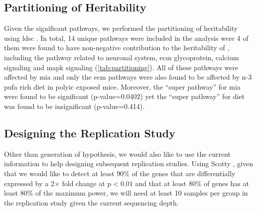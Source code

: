\documentclass[12pt]{scrbook}
\newcommand*{\glng}{\glsentrylong}
\begin{document}
\subsection{Partitioning of Heritability}
Given the significant pathways, we performed the partitioning of heritability using \gls{ldsc} \citep{Bulik-Sullivan2015}.
In total, 14 unique pathways were included in the analysis were 4 of them were found to have non-negative contribution to the heritability of \glng{scz}, including the pathway related to neuronal system, \gls{ecm} glycoprotein, calcium signaling and \gls{mapk} signaling (\cref{tab:partitioning}).
All of these pathways were affected by \gls{mia} and only the \gls{ecm} pathways were also found to be affected by n-3 \gls{pufa} rich diet in \gls{polyic} exposed mice.
Moreover, the ``super pathway'' for \gls{mia} were found to be significant (p-value=0.0402) yet the ``super pathway'' for diet was found to be insignificant (p-value=0.414).

\subsection{Designing the Replication Study}
Other than generation of hypothesis, we would also like to use the current information to help designing subsequent replication studies.
Using Scotty \citep{Busby2013}, given that we would like to detect at least 90\% of the genes that are differentially expressed by a 2$\times$ fold change at p$<0.01$ and that at least 80\% of genes has at least 80\% of the maximum power, we will need at least 10 samples per group in the replication study given the current sequencing depth.
\end{document}
